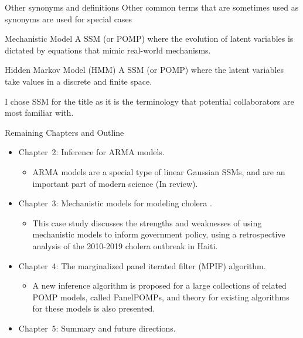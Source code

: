 \documentclass[aspectratio=169]{beamer}\usepackage[]{graphicx}\usepackage[]{xcolor}
\begin{document}
\begin{frame}{Other synonyms and definitions}
  Other common terms that are sometimes used as synonyms are used for special cases 
  \begin{block}{Mechanistic Model}
    A SSM (or POMP) where the evolution of latent variables is dictated by equations that mimic real-world mechanisms. 
  \end{block}
  
  \begin{block}{Hidden Markov Model (HMM)}
    A SSM (or POMP) where the latent variables take values in a discrete and finite space.
  \end{block}

I chose SSM for the title as it is the terminology that potential collaborators are most familiar with.

\end{frame}

\begin{frame}{Remaining Chapters and Outline}
  \begin{itemize}
    \item \alert{Chapter~2:} Inference for ARMA models.
      \begin{itemize}
        \item ARMA models are a special type of linear Gaussian SSMs, and are an important part of modern science (In review). 
      \end{itemize}
    \item \alert{Chapter~3:} Mechanistic models for modeling cholera \citep{wheeler24}.
      \begin{itemize}
        \item This case study discusses the strengths and weaknesses of using mechanistic models to inform government policy, using a retrospective analysis of the 2010-2019 cholera outbreak in Haiti.
      \end{itemize}
    \item \alert{Chapter~4:} The marginalized panel iterated filter (MPIF) algorithm.
    \begin{itemize}
      \item A new inference algorithm is proposed for a large collections of related POMP models, called PanelPOMPs, and theory for existing algorithms for these models is also presented.
    \end{itemize}
    \item \alert{Chapter~5:} Summary and future directions.
  \end{itemize}
\end{frame}
\end{document}
